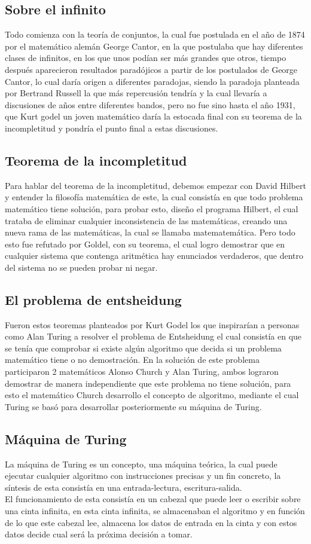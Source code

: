 \documentclass[conference,compsoc]{IEEEtran}
\begin{document}
\subsection{Sobre el infinito}
Todo comienza con la teoría de conjuntos, la cual fue postulada en el año de 1874 por el matemático alemán George Cantor, en la que postulaba que hay diferentes clases de infinitos, en los que unos podían ser más grandes que otros, tiempo después aparecieron resultados paradójicos a partir de los postulados de George Cantor, lo cual daría origen a diferentes paradojas, siendo la paradoja planteada por Bertrand Russell la que más  repercusión tendría y la cual llevaría a  discusiones de años entre diferentes bandos, pero no fue sino hasta el año 1931, que Kurt godel un joven matemático daría la estocada final con su teorema de la incompletitud y pondría el punto final a estas discusiones.
\subsection{Teorema de la incompletitud}
Para hablar del teorema de la incompletitud, debemos empezar con David Hilbert y  entender la filosofía matemática de este, la cual consistía en que todo problema matemático tiene solución, para probar esto, diseño el programa Hilbert, el cual trataba de eliminar cualquier inconsistencia de las matemáticas, creando una nueva rama de las matemáticas, la cual se llamaba matematemática. Pero todo esto fue refutado por Goldel, con su teorema, el cual logro demostrar que en cualquier sistema que contenga aritmética hay enunciados verdaderos, que dentro del sistema no se pueden probar ni negar.
\subsection{El problema de entsheidung}
Fueron estos teoremas planteados por Kurt Godel los que inspirarían a personas como Alan Turing a resolver el problema de Entsheidung el cual consistía en que se tenía que comprobar si existe algún algoritmo que decida si un problema matemático tiene o no  demostración. En la solución de este problema participaron 2 matemáticos  Alonso Church y Alan Turing, ambos lograron demostrar de manera independiente que este problema no tiene solución, para esto  el matemático Church desarrollo el concepto de algoritmo, mediante el cual Turing se basó para desarrollar posteriormente su máquina de Turing.
\subsection{Máquina de Turing}
La máquina de Turing es un concepto, una máquina teórica, la cual puede ejecutar cualquier algoritmo con instrucciones precisas  y un fin concreto, la síntesis de esta consistía en una entrada-lectura, escritura-salida.\\
El funcionamiento de esta consistía en un cabezal que puede leer o escribir sobre una cinta infinita, en esta cinta infinita, se almacenaban el algoritmo y en función de lo que este cabezal lee, almacena los datos de entrada en la cinta y con estos datos  decide cual será la próxima decisión a tomar. 
\end{document}

